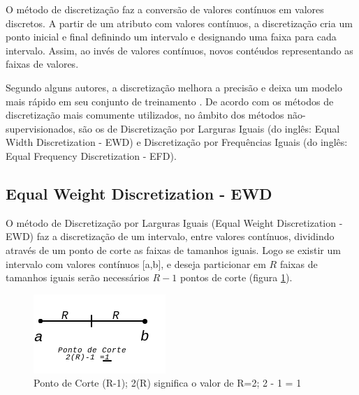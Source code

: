 O método de discretização faz a conversão de valores contínuos em valores discretos. A partir de um atributo com valores contínuos, a discretização cria um ponto inicial e final definindo um intervalo e designando uma faixa para cada intervalo. Assim, ao invés de valores contínuos, novos contéudos representando as faixas de valores.

Segundo alguns autores, a discretização melhora a precisão e deixa um modelo mais rápido em seu conjunto de treinamento \cite{Catlett2006b,Hwang2002}. De acordo com \cite{Kotsiantis2006, Dougherty1995} os métodos de discretização mais comumente utilizados, no âmbito dos métodos  não-supervisionados,  são os de Discretização por Larguras Iguais (do inglês: Equal Width Discretization - EWD) e Discretização por Frequências Iguais (do inglês: Equal Frequency Discretization - EFD).




\subsection{Equal Weight Discretization - EWD}\label{cap:refTeor:subsec:ewd}

O método de Discretização por Larguras Iguais (Equal Weight Discretization - EWD) faz a discretização de um intervalo, entre valores contínuos, dividindo através de um ponto de corte as faixas de tamanhos iguais. Logo se existir um intervalo com valores contínuos [a,b], e deseja particionar em ${R}$ faixas de tamanhos iguais serão necessários ${R-1}$ pontos de corte (figura \ref{fig:pontocorte}). 

\begin{figure}[h]
        \centering
        \includegraphics[scale=1]{figs/faixaA-B_PontoCorte.png}
        \caption{Ponto de Corte (R-1); 2(R) significa o valor de R=2; 2 - 1 = 1} \label{fig:pontocorte}
\end{figure}

